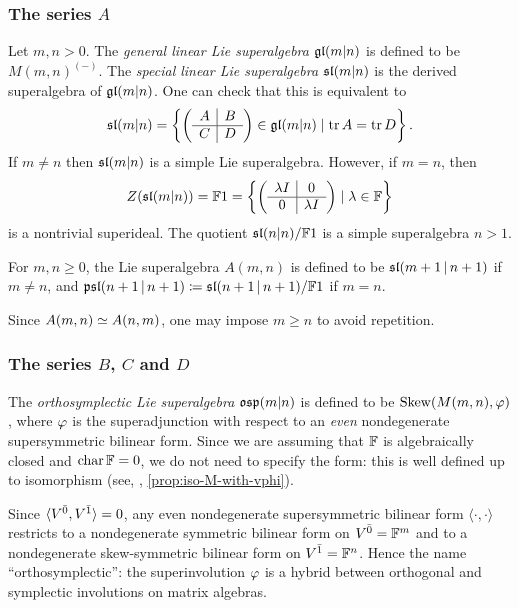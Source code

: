 \subsubsection{The series $A$} 

Let $m,n > 0$. 
The \emph{general linear Lie superalgebra} $\mathfrak{gl}(m|n)$ is defined to be $M(m,n)^{(-)}$. 
The \emph{special linear Lie superalgebra} $\mathfrak{sl} (m|n)$ is the derived superalgebra of $\mathfrak{gl}(m|n)$. 
One can check that this is equivalent to
%
\[
    \mathfrak{sl}(m|n) = \left\{
    \left(\begin{array}{c|c}
        A & B\\
        \hline
        C & D
    \end{array}\right)
	\in \mathfrak{gl}(m|n)
	\mid \operatorname{tr} A = \operatorname{tr} D
	\right\}.
\]
%
If $m\neq n$ then $\mathfrak{sl}(m|n)$ is a simple Lie superalgebra. 
However, if $m=n$, then
\[
    Z(\mathfrak{sl}(m|n)) = \mathbb{F} 1 = \left\{
    \left(\begin{array}{c|c}
        \lambda I & 0\\
        \hline
        0 & \lambda I
    \end{array}\right)
	\mid \lambda \in \mathbb{F}
	\right\}
\]
is a nontrivial superideal. 
The quotient $\mathfrak{sl}(n|n)/ \mathbb{F} 1$ is a simple superalgebra \IFF $n > 1$. 

For $m,n\geq 0$, the Lie superalgebra $A(m,n)$ is defined to be $\mathfrak{sl}(m+1 \,|\, n+1)$ if $m\neq n$, and $\mathfrak{psl}(n+1 \,|\, n+1) \coloneqq \mathfrak{sl}(n+1 \,|\, n+1)/ \mathbb{F} 1$ if $m=n$. 

Since $A(m,n)\simeq A(n,m)$, one may impose $m\geq n$ to avoid repetition. 

\subsubsection{The series $B$, $C$ and $D$}

The \emph{orthosymplectic Lie superalgebra} $\mathfrak{osp}(m|n)$ is defined to be $\operatorname{Skew}(M(m,n),\varphi)$, where $\varphi$ is the superadjunction with respect to an \emph{even} nondegenerate supersymmetric bilinear form. 
Since we are assuming that $\mathbb{F}$ is algebraically closed and $\operatorname{char} \mathbb{F} = 0$, we do not need to specify the form: this is well defined up to isomorphism (see, \eg, \cref{prop:iso-M-with-vphi}). 

Since $\langle V^{\bar0}, V^{\bar1} \rangle = 0$, any even nondegenerate supersymmetric bilinear form $\langle \cdot, \cdot \rangle$ restricts to a nondegenerate symmetric bilinear form on $V^{\bar0} = \mathbb{F}^m$ and to a nondegenerate skew-symmetric bilinear form on $V^{\bar1} = \mathbb{F}^n$. 
Hence the name ``orthosymplectic'': the superinvolution $\varphi$ is a hybrid between orthogonal and symplectic involutions on matrix algebras. 

